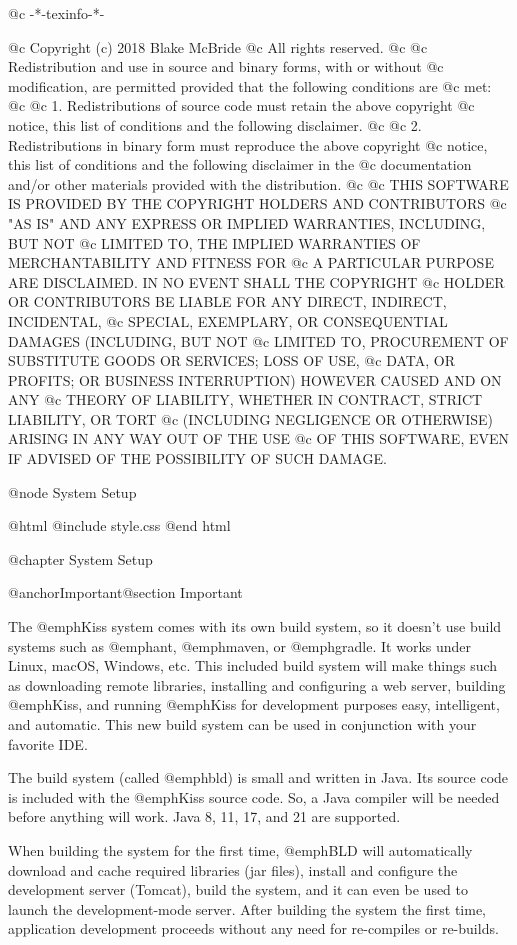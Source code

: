 @c -*-texinfo-*-

@c  Copyright (c) 2018 Blake McBride
@c  All rights reserved.
@c
@c  Redistribution and use in source and binary forms, with or without
@c  modification, are permitted provided that the following conditions are
@c  met:
@c
@c  1. Redistributions of source code must retain the above copyright
@c  notice, this list of conditions and the following disclaimer.
@c
@c  2. Redistributions in binary form must reproduce the above copyright
@c  notice, this list of conditions and the following disclaimer in the
@c  documentation and/or other materials provided with the distribution.
@c
@c  THIS SOFTWARE IS PROVIDED BY THE COPYRIGHT HOLDERS AND CONTRIBUTORS
@c  "AS IS" AND ANY EXPRESS OR IMPLIED WARRANTIES, INCLUDING, BUT NOT
@c  LIMITED TO, THE IMPLIED WARRANTIES OF MERCHANTABILITY AND FITNESS FOR
@c  A PARTICULAR PURPOSE ARE DISCLAIMED. IN NO EVENT SHALL THE COPYRIGHT
@c  HOLDER OR CONTRIBUTORS BE LIABLE FOR ANY DIRECT, INDIRECT, INCIDENTAL,
@c  SPECIAL, EXEMPLARY, OR CONSEQUENTIAL DAMAGES (INCLUDING, BUT NOT
@c  LIMITED TO, PROCUREMENT OF SUBSTITUTE GOODS OR SERVICES; LOSS OF USE,
@c  DATA, OR PROFITS; OR BUSINESS INTERRUPTION) HOWEVER CAUSED AND ON ANY
@c  THEORY OF LIABILITY, WHETHER IN CONTRACT, STRICT LIABILITY, OR TORT
@c  (INCLUDING NEGLIGENCE OR OTHERWISE) ARISING IN ANY WAY OUT OF THE USE
@c  OF THIS SOFTWARE, EVEN IF ADVISED OF THE POSSIBILITY OF SUCH DAMAGE.


@node System Setup

@html
@include style.css
@end html

@chapter System Setup

@anchor{Important}@section Important

The @emph{Kiss} system comes with its own build system, so it doesn't
use build systems such as @emph{ant}, @emph{maven}, or @emph{gradle}.
It works under Linux, macOS, Windows, etc. This included build system
will make things such as downloading remote libraries, installing and
configuring a web server, building @emph{Kiss}, and running
@emph{Kiss} for development purposes easy, intelligent, and automatic.
This new build system can be used in conjunction with your favorite IDE.

The build system (called @emph{bld}) is small and written in Java.
Its source code is included with the @emph{Kiss} source code.  So, a
Java compiler will be needed before anything will work.  
Java 8, 11, 17, and 21 are supported.

When building the system for the first time, @emph{BLD} will
automatically download and cache required libraries (jar files), install and
configure the development server (Tomcat), build the system, and it
can even be used to launch the development-mode server.  After building
the system the first time, application development proceeds without
any need for re-compiles or re-builds.

